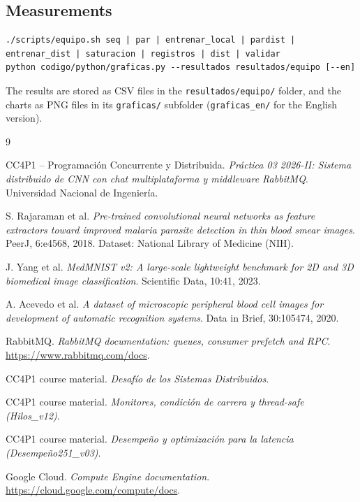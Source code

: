 \documentclass[10pt,a4paper]{article}
\begin{document}
\subsection*{Measurements}

\begin{lstlisting}[language={},numbers=none]
./scripts/equipo.sh seq | par | entrenar_local | pardist | entrenar_dist | saturacion | registros | dist | validar
python codigo/python/graficas.py --resultados resultados/equipo [--en]
\end{lstlisting}

The results are stored as CSV files in the \texttt{resultados/equipo/} folder, and the charts as PNG
files in its \texttt{graficas/} subfolder (\texttt{graficas\_en/} for the English version).

\newpage
\begin{thebibliography}{9}

CC4P1 -- Programación Concurrente y Distribuida.
\textit{Práctica 03 2026-II: Sistema distribuido de CNN con chat multiplataforma y middleware RabbitMQ}.
Universidad Nacional de Ingeniería.

S. Rajaraman et al.
\textit{Pre-trained convolutional neural networks as feature extractors toward improved malaria parasite detection in thin blood smear images}.
PeerJ, 6:e4568, 2018. Dataset: National Library of Medicine (NIH).

J. Yang et al.
\textit{MedMNIST v2: A large-scale lightweight benchmark for 2D and 3D biomedical image classification}.
Scientific Data, 10:41, 2023.

A. Acevedo et al.
\textit{A dataset of microscopic peripheral blood cell images for development of automatic recognition systems}.
Data in Brief, 30:105474, 2020.

RabbitMQ.
\textit{RabbitMQ documentation: queues, consumer prefetch and RPC}.
\url{https://www.rabbitmq.com/docs}.

CC4P1 course material.
\textit{Desafío de los Sistemas Distribuidos}.

CC4P1 course material.
\textit{Monitores, condición de carrera y thread-safe (Hilos\_v12)}.

CC4P1 course material.
\textit{Desempeño y optimización para la latencia (Desempeño251\_v03)}.

Google Cloud.
\textit{Compute Engine documentation}.
\url{https://cloud.google.com/compute/docs}.

\end{thebibliography}
\end{document}
